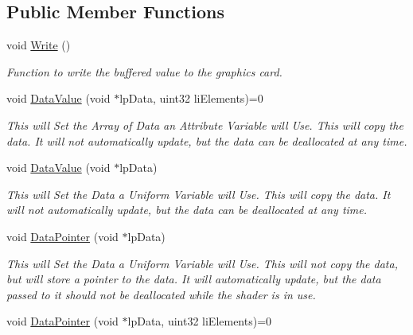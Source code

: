 \subsection*{Public Member Functions}
\begin{DoxyCompactItemize}
\item 
\hypertarget{classc_attribute_store_a459866aef786182597d456dc79e26e58}{
void \hyperlink{classc_attribute_store_a459866aef786182597d456dc79e26e58}{Write} ()}
\label{classc_attribute_store_a459866aef786182597d456dc79e26e58}

\begin{DoxyCompactList}\small\item\em Function to write the buffered value to the graphics card. \end{DoxyCompactList}\item 
\hypertarget{classc_attribute_store_a69cb1bcc9f595cd720314c244d6d793a}{
void \hyperlink{classc_attribute_store_a69cb1bcc9f595cd720314c244d6d793a}{DataValue} (void $\ast$lpData, uint32 liElements)=0}
\label{classc_attribute_store_a69cb1bcc9f595cd720314c244d6d793a}

\begin{DoxyCompactList}\small\item\em This will Set the Array of Data an Attribute Variable will Use. This will copy the data. It will not automatically update, but the data can be deallocated at any time. \end{DoxyCompactList}\item 
\hypertarget{classc_attribute_store_a7acc5153925532b260f26b90fcfeeb32}{
void \hyperlink{classc_attribute_store_a7acc5153925532b260f26b90fcfeeb32}{DataValue} (void $\ast$lpData)}
\label{classc_attribute_store_a7acc5153925532b260f26b90fcfeeb32}

\begin{DoxyCompactList}\small\item\em This will Set the Data a Uniform Variable will Use. This will copy the data. It will not automatically update, but the data can be deallocated at any time. \end{DoxyCompactList}\item 
\hypertarget{classc_attribute_store_a07f2f617cc6fb0bad9ba6337e0b0991e}{
void \hyperlink{classc_attribute_store_a07f2f617cc6fb0bad9ba6337e0b0991e}{DataPointer} (void $\ast$lpData)}
\label{classc_attribute_store_a07f2f617cc6fb0bad9ba6337e0b0991e}

\begin{DoxyCompactList}\small\item\em This will Set the Data a Uniform Variable will Use. This will not copy the data, but will store a pointer to the data. It will automatically update, but the data passed to it should not be deallocated while the shader is in use. \end{DoxyCompactList}\item 
\hypertarget{classc_attribute_store_a2cafff0276874cf2b4be95ae2ed194fe}{
void \hyperlink{classc_attribute_store_a2cafff0276874cf2b4be95ae2ed194fe}{DataPointer} (void $\ast$lpData, uint32 liElements)=0}
\label{classc_attribute_store_a2cafff0276874cf2b4be95ae2ed194fe}


\end{DoxyCompactItemize}
